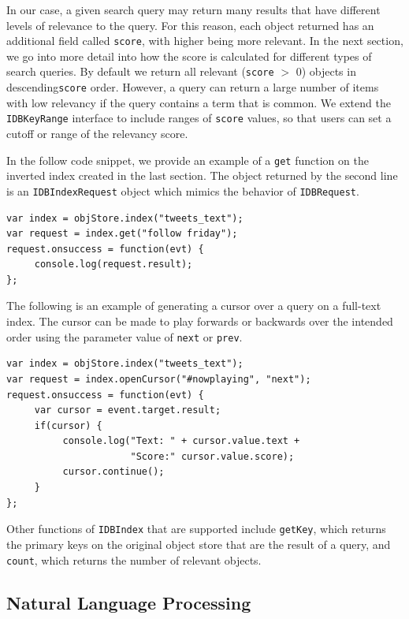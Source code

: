 \documentclass{vldb}
\begin{document}
In our case, a given search query may return many results that have different levels of relevance to the query. For this reason, each object returned has an additional field called \texttt{score},  with higher being more relevant. 
In the next section, we go into more detail into how the score is calculated for different types of search queries.
By default we return all relevant (\texttt{score} $>$ 0) objects in descending\texttt{score} order. 
However, a query can return a large number of items with low relevancy if the query contains a term that is common. We extend the \texttt{IDBKeyRange} interface to include ranges of \texttt{score} values, so that users can set a cutoff or range of the relevancy score.

In the follow code snippet, we provide an example of a \texttt{get} function on the inverted index created in the last section. The object returned by the second line is an \texttt{IDBIndexRequest} object which mimics the behavior of \texttt{IDBRequest}.

\begin{verbatim}
var index = objStore.index("tweets_text");
var request = index.get("follow friday");
request.onsuccess = function(evt) {
     console.log(request.result);
};
\end{verbatim}

The following is an example of generating a cursor over a query on a full-text index. The cursor can be made to play forwards or backwards over the intended order using the parameter value of \texttt{next} or \texttt{prev}.

\begin{verbatim}
var index = objStore.index("tweets_text");
var request = index.openCursor("#nowplaying", "next");
request.onsuccess = function(evt) {
     var cursor = event.target.result;
     if(cursor) {
          console.log("Text: " + cursor.value.text +
                      "Score:" cursor.value.score);
          cursor.continue();
     }
};
\end{verbatim}

Other functions of \texttt{IDBIndex} that are supported include \texttt{getKey}, which returns the primary keys on the original object store that are the result of a query, and \texttt{count}, which returns the number of relevant objects.


\subsection{Natural Language Processing}
\end{document}
